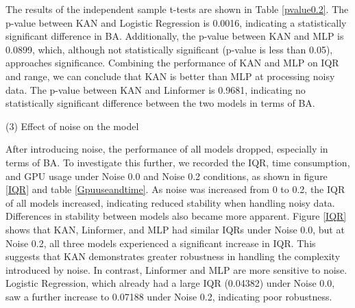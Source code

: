 \documentclass{article}
\begin{document}
The results of the independent sample t-tests are shown in Table \ref{pvalue0.2}. The p-value between KAN and Logistic Regression is 0.0016, indicating a statistically significant difference in BA. Additionally, the p-value between KAN and MLP is 0.0899, which, although not statistically significant (p-value is less than 0.05), approaches significance. Combining the performance of KAN and MLP on IQR and range, we can conclude that KAN is better than MLP at processing noisy data. The p-value between KAN and Linformer is 0.9681, indicating no statistically significant difference between the two models in terms of BA.

 

\begin{table}[htbp]
\centering
\caption{Time Taken and GPU Usage under Different Noise Conditions}
\label{Gpuuseandtime}
\end{table}






(3) Effect of noise on the model

After introducing noise, the performance of all models dropped, especially in terms of BA. To investigate this further, we recorded the IQR, time consumption, and GPU usage under Noise 0.0 and Noise 0.2 conditions, as shown in figure \ref{IQR} and table \ref{Gpuuseandtime}. As noise was increased from 0 to 0.2, the IQR of all models increased, indicating reduced stability when handling noisy data. Differences in stability between models also became more apparent. Figure \ref{IQR} shows that KAN, Linformer, and MLP had similar IQRs under Noise 0.0, but at Noise 0.2, all three models experienced a significant increase in IQR. This suggests that KAN demonstrates greater robustness in handling the complexity introduced by noise. In contrast, Linformer and MLP are more sensitive to noise. Logistic Regression, which already had a large IQR (0.04382) under Noise 0.0, saw a further increase to 0.07188 under Noise 0.2, indicating poor robustness.
\end{document}
